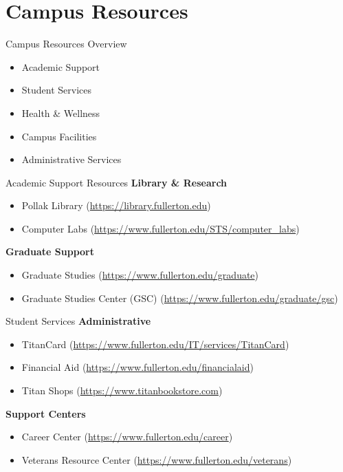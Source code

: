 \documentclass[10pt]{beamer}
\begin{document}
\section{\textcolor{titanorange}{Campus Resources}}
\begin{frame}{Campus Resources Overview}
\begin{itemize}
  \item Academic Support
  \item Student Services
  \item Health \& Wellness
  \item Campus Facilities
  \item Administrative Services
\end{itemize}
\end{frame}

\begin{frame}{Academic Support Resources}
\textbf{Library \& Research}
\begin{itemize}
  \item Pollak Library \small(\url{https://library.fullerton.edu})
  \item Computer Labs \small(\url{https://www.fullerton.edu/STS/computer_labs})
\end{itemize}

\textbf{Graduate Support}
\begin{itemize}
  \item Graduate Studies \small(\url{https://www.fullerton.edu/graduate})
  \item Graduate Studies Center (GSC) \small(\url{https://www.fullerton.edu/graduate/gsc})
\end{itemize}
\end{frame}

\begin{frame}{Student Services}
\textbf{Administrative}
\begin{itemize}
  \item TitanCard \small(\url{https://www.fullerton.edu/IT/services/TitanCard})
  \item Financial Aid \small(\url{https://www.fullerton.edu/financialaid})
  \item Titan Shops \small(\url{https://www.titanbookstore.com})
\end{itemize}

\textbf{Support Centers}
\begin{itemize}
  \item Career Center \small(\url{https://www.fullerton.edu/career})
  \item Veterans Resource Center \small(\url{https://www.fullerton.edu/veterans})
\end{itemize}
\end{frame}
\end{document}
